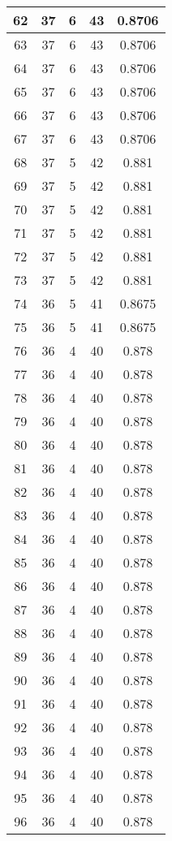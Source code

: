 \documentclass[letterpaper, 12pt]{article}
\begin{document}
\begin{longtable}{|c|c|c|c|c|}
\hline
62 & 37 & 6 & 43 & 0.8706 \\
\hline
63 & 37 & 6 & 43 & 0.8706 \\
\hline
64 & 37 & 6 & 43 & 0.8706 \\
\hline
65 & 37 & 6 & 43 & 0.8706 \\
\hline
66 & 37 & 6 & 43 & 0.8706 \\
\hline
67 & 37 & 6 & 43 & 0.8706 \\
\hline
68 & 37 & 5 & 42 & 0.881 \\
\hline
69 & 37 & 5 & 42 & 0.881 \\
\hline
70 & 37 & 5 & 42 & 0.881 \\
\hline
71 & 37 & 5 & 42 & 0.881 \\
\hline
72 & 37 & 5 & 42 & 0.881 \\
\hline
73 & 37 & 5 & 42 & 0.881 \\
\hline
74 & 36 & 5 & 41 & 0.8675 \\
\hline
75 & 36 & 5 & 41 & 0.8675 \\
\hline
76 & 36 & 4 & 40 & 0.878 \\
\hline
77 & 36 & 4 & 40 & 0.878 \\
\hline
78 & 36 & 4 & 40 & 0.878 \\
\hline
79 & 36 & 4 & 40 & 0.878 \\
\hline
80 & 36 & 4 & 40 & 0.878 \\
\hline
81 & 36 & 4 & 40 & 0.878 \\
\hline
82 & 36 & 4 & 40 & 0.878 \\
\hline
83 & 36 & 4 & 40 & 0.878 \\
\hline
84 & 36 & 4 & 40 & 0.878 \\
\hline
85 & 36 & 4 & 40 & 0.878 \\
\hline
86 & 36 & 4 & 40 & 0.878 \\
\hline
87 & 36 & 4 & 40 & 0.878 \\
\hline
88 & 36 & 4 & 40 & 0.878 \\
\hline
89 & 36 & 4 & 40 & 0.878 \\
\hline
90 & 36 & 4 & 40 & 0.878 \\
\hline
91 & 36 & 4 & 40 & 0.878 \\
\hline
92 & 36 & 4 & 40 & 0.878 \\
\hline
93 & 36 & 4 & 40 & 0.878 \\
\hline
94 & 36 & 4 & 40 & 0.878 \\
\hline
95 & 36 & 4 & 40 & 0.878 \\
\hline
96 & 36 & 4 & 40 & 0.878 \\

\end{longtable}
\end{document}
